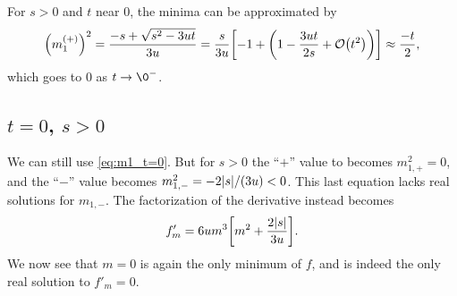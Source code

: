 \documentclass[11pt,letter, swedish, english
]{article}
\begin{document}
For $s>0$ and $t$ near 0, the minima can be approximated by
\begin{equation}
\qty(m_{1}^{(+)})^2=\frac{-s+\sqrt{s^2-3ut}}{3u}
=\frac{s}{3u}\qty[-1+\qty(1-\frac{3ut}{2s}+\order{t^2})]
\approx \frac{-t}{2},%
\end{equation}
which goes to $0$ as $t\to\0^-$.

\subsection{$t=0$, $s>0$}
We can still use \eqref{eq:m1_t=0}. But for $s>0$ the ``$+$'' value to
becomes $m_{1,+}^2=0$, and the ``$-$'' value becomes
$m_{1,-}^2=-2\abs{s}/(3u)<0$. This last equation lacks real solutions
for $m_{1,-}$. 
The factorization of the derivative instead becomes
\begin{equation}%
f'_m=6um^3\qty[m^2+\frac{2\abs{s}}{3u}].
\end{equation}
We now see that $m=0$ is again the only minimum of $f$, and is indeed the
only real solution to $f'_m=0$.
\end{document}
